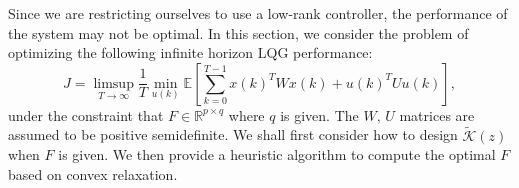   Since we are restricting ourselves to use a low-rank controller, the performance of the system may not be optimal. In this section, we consider the problem of optimizing the following infinite horizon LQG performance:
  \begin{equation}
    J = \limsup_{T\rightarrow \infty}\frac{1}{T}\min_{u(k)}\mathbb{E}\left[\sum_{k=0}^{T-1} x(k)^TWx(k)+u(k)^TUu(k)\right],
    \label{eq:lqgcost}
  \end{equation}
  under the constraint that $F \in \mathbb R^{p\times q}$ where $q$ is given. The $W,\,U$ matrices are assumed to be positive semidefinite. We shall first consider how to design $\tilde {\mathcal K}(z)$ when $F$ is given. We then provide a heuristic algorithm to compute the optimal $F$ based on convex relaxation.

